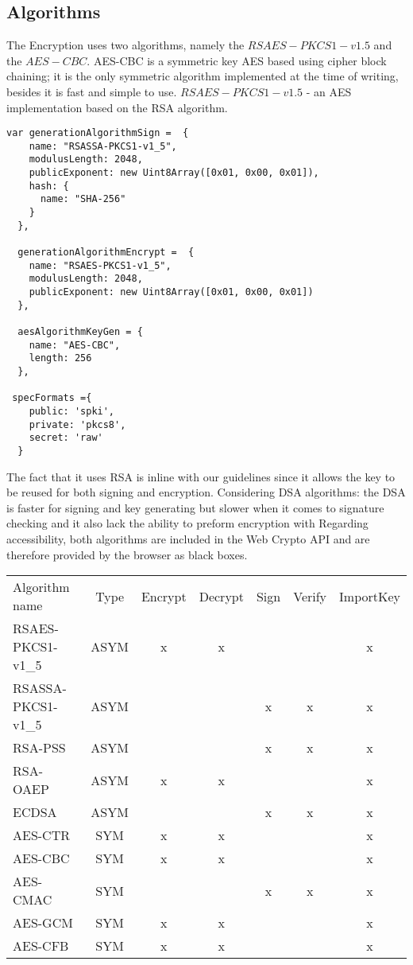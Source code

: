 \subsection{Algorithms}
The Encryption uses two algorithms, namely the $RSAES-PKCS1-v1.5$ and the $AES-CBC$.
AES-CBC is a symmetric key AES based using cipher block chaining; it is the only symmetric algorithm implemented at the time of writing, besides it is fast\cite{AESISFAST:Online} and simple to use.
$RSAES-PKCS1-v1.5$ - an AES implementation based on the RSA algorithm.
\begin{Code}
\begin{lstlisting}[caption={Algorithms implemented}, label={lst:api}]
  var generationAlgorithmSign =  {
    name: "RSASSA-PKCS1-v1_5",
    modulusLength: 2048,
    publicExponent: new Uint8Array([0x01, 0x00, 0x01]),
    hash: {
      name: "SHA-256"
    }
  },

  generationAlgorithmEncrypt =  {
    name: "RSAES-PKCS1-v1_5",
    modulusLength: 2048,
    publicExponent: new Uint8Array([0x01, 0x00, 0x01])
  },

  aesAlgorithmKeyGen = {
    name: "AES-CBC",
    length: 256
  },

 specFormats ={
    public: 'spki',
    private: 'pkcs8',
    secret: 'raw'
  }
\end{lstlisting}
\end{Code}
The fact that it uses RSA is inline with our guidelines since it allows the key to be reused for both signing and encryption.
Considering DSA algorithms: the DSA is faster for signing and key generating but slower when it comes to signature checking and it also lack the ability to preform encryption with
Regarding accessibility, both algorithms are included in the Web Crypto API and are therefore provided by the browser as black boxes.
\begin{table}[h]
\centering
\begin{tabular}{lcccccc}
Algorithm name & Type & Encrypt & Decrypt & Sign & Verify & ImportKey \\
RSAES-PKCS1-v1\_5 & ASYM & x & x &  &  & x \\
RSASSA-PKCS1-v1\_5 & ASYM &  &  & x & x & x \\
RSA-PSS & ASYM &  &  & x & x & x \\
RSA-OAEP & ASYM & x & x &  &  & x \\
ECDSA & ASYM &  &  & x & x & x \\
AES-CTR & SYM & x & x &  &  & x \\
AES-CBC & SYM & x & x &  &  & x \\
AES-CMAC & SYM &  &  & x & x & x \\
AES-GCM & SYM & x & x &  &  & x \\
AES-CFB & SYM & x & x &  &  & x
\end{tabular}
\end{table}
